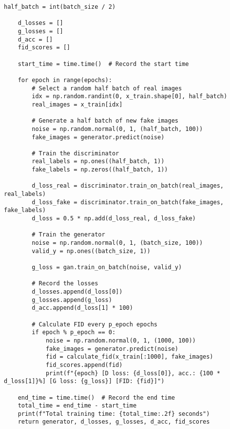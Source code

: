 \begin{lstlisting}[style=mypython, caption= {Explore GAN with 6 Convolutional Layers in Generator \\ and 6 Convolutional Layers in Discriminator}]
    half_batch = int(batch_size / 2)
    
    d_losses = []
    g_losses = []
    d_acc = []
    fid_scores = []
    
    start_time = time.time()  # Record the start time

    for epoch in range(epochs):
        # Select a random half batch of real images
        idx = np.random.randint(0, x_train.shape[0], half_batch)
        real_images = x_train[idx]

        # Generate a half batch of new fake images
        noise = np.random.normal(0, 1, (half_batch, 100))
        fake_images = generator.predict(noise)

        # Train the discriminator
        real_labels = np.ones((half_batch, 1))
        fake_labels = np.zeros((half_batch, 1))

        d_loss_real = discriminator.train_on_batch(real_images, real_labels)
        d_loss_fake = discriminator.train_on_batch(fake_images, fake_labels)
        d_loss = 0.5 * np.add(d_loss_real, d_loss_fake)

        # Train the generator
        noise = np.random.normal(0, 1, (batch_size, 100))
        valid_y = np.ones((batch_size, 1))

        g_loss = gan.train_on_batch(noise, valid_y)

        # Record the losses
        d_losses.append(d_loss[0])
        g_losses.append(g_loss)
        d_acc.append(d_loss[1] * 100)
        
        # Calculate FID every p_epoch epochs
        if epoch % p_epoch == 0:
            noise = np.random.normal(0, 1, (1000, 100))
            fake_images = generator.predict(noise)
            fid = calculate_fid(x_train[:1000], fake_images)
            fid_scores.append(fid)
            print(f"{epoch} [D loss: {d_loss[0]}, acc.: {100 * d_loss[1]}%] [G loss: {g_loss}] [FID: {fid}]")

    end_time = time.time()  # Record the end time
    total_time = end_time - start_time
    print(f"Total training time: {total_time:.2f} seconds")
    return generator, d_losses, g_losses, d_acc, fid_scores
\end{lstlisting}


